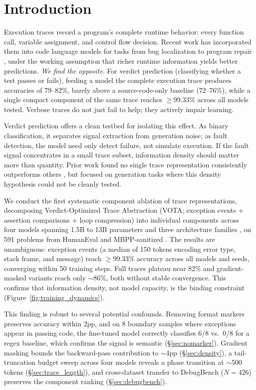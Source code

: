 \section{Introduction}

Execution traces record a program's complete runtime behavior: every function call, variable assignment, and control flow decision.
Recent work has incorporated them into code language models for tasks from bug localization to program repair \citep{chen2025tracepile,ding2024traced,wang2025dcsh,ni2024next}, under the working assumption that richer runtime information yields better predictions.
\emph{We find the opposite.}
For verdict prediction (classifying whether a test passes or fails), feeding a model the complete execution trace produces accuracies of 79--82\%, barely above a source-code-only baseline (72--76\%), while a single compact component of the same trace reaches ${\geq}$99.33\% across all models tested.
Verbose traces do not just fail to help; they actively impair learning.

Verdict prediction offers a clean testbed for isolating this effect.
As binary classification, it separates signal extraction from generation noise; as fault detection, the model need only detect failure, not simulate execution.
If the fault signal concentrates in a small trace subset, information density should matter more than quantity.
Prior work found no single trace representation consistently outperforms others \citep{wang2025dcsh}, but focused on generation tasks where this density hypothesis could not be cleanly tested.

We conduct the first systematic component ablation of trace representations, decomposing Verdict-Optimized Trace Abstraction (VOTA; exception events + assertion comparisons + loop compression) into individual components across four models spanning 1.5B to 13B parameters and three architecture families \citep{qwen2025coder,roziere2024code,deepseek2024coder}, on 591 problems from HumanEval \citep{chen2021evaluating} and MBPP-sanitized \citep{austin2021program}.
The results are unambiguous: exception events (a median of 150 tokens encoding error type, stack frame, and message) reach ${\geq}$99.33\% accuracy across all models and seeds, converging within 50 training steps.
Full traces plateau near 82\% and gradient-masked variants reach only ${\sim}$86\%, both without stable convergence. This confirms that information density, not model capacity, is the binding constraint (Figure~\ref{fig:training_dynamics}).

This finding is robust to several potential confounds.
Removing format markers preserves accuracy within 2pp, and on 8 boundary samples where exceptions appear in passing code, the fine-tuned model correctly classifies 6/8 vs.\ 0/8 for a regex baseline, which confirms the signal is semantic (\S\ref{sec:nomarker}).
Gradient masking bounds the backward-pass contribution to ${\sim}$4pp (\S\ref{sec:density}), a tail-truncation budget sweep across four models reveals a phase transition at ${\sim}$500 tokens (\S\ref{sec:trace_length}), and cross-dataset transfer to DebugBench ($N{=}426$) preserves the component ranking (\S\ref{sec:debugbench}).

